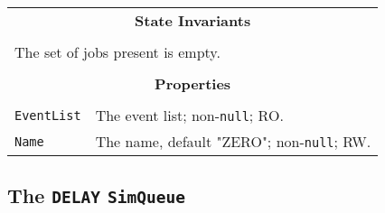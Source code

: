 \documentclass[12pt]{book}
\begin{document}
\begin{tabular}{|l|l|l|}
\multicolumn{3}{|c|}{\bf State  Invariants} \\
\multicolumn{3}{|c|}{} \\
\hline
\multicolumn{3}{|l|}{The set of jobs present is empty.} \\
\hline
\multicolumn{3}{|c|}{} \\
\multicolumn{3}{|c|}{\bf Properties} \\
\multicolumn{3}{|c|}{} \\
\hline
\lstinline|EventList| & \multicolumn{2}{|l|}{The event list; non-\lstinline|null|; RO.} \\
\hline
\lstinline|Name|      & \multicolumn{2}{|l|}{The name, default "ZERO"; non-\lstinline|null|; RW.} \\
\hline
\end{tabular}

\subsection{The \lstinline{DELAY} \lstinline{SimQueue}}
\end{document}
